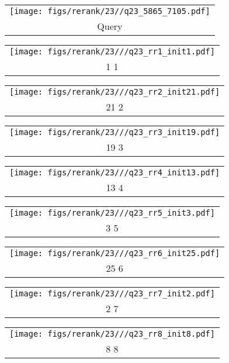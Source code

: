 \begin{figure*}[t]
\begin{tabular}{@{\sssp}c@{\sssp}}\texttt{[image: figs/rerank/23//q23\_5865\_7105.pdf]}\\Query\\ \end{tabular} 
\begin{tabular}{@{\sssp}c@{\sssp}}\texttt{[image: figs/rerank/23///q23\_rr1\_init1.pdf]}\\1  1\\ \end{tabular} 
\begin{tabular}{@{\sssp}c@{\sssp}}\texttt{[image: figs/rerank/23///q23\_rr2\_init21.pdf]}\\21  2\\ \end{tabular} 
\begin{tabular}{@{\sssp}c@{\sssp}}\texttt{[image: figs/rerank/23///q23\_rr3\_init19.pdf]}\\19  3\\ \end{tabular} 
\begin{tabular}{@{\sssp}c@{\sssp}}\texttt{[image: figs/rerank/23///q23\_rr4\_init13.pdf]}\\13  4\\ \end{tabular} 
\begin{tabular}{@{\sssp}c@{\sssp}}\texttt{[image: figs/rerank/23///q23\_rr5\_init3.pdf]}\\3  5\\ \end{tabular} 
\begin{tabular}{@{\sssp}c@{\sssp}}\texttt{[image: figs/rerank/23///q23\_rr6\_init25.pdf]}\\25  6\\ \end{tabular} 
\begin{tabular}{@{\sssp}c@{\sssp}}\texttt{[image: figs/rerank/23///q23\_rr7\_init2.pdf]}\\2  7\\ \end{tabular} 
\begin{tabular}{@{\sssp}c@{\sssp}}\texttt{[image: figs/rerank/23///q23\_rr8\_init8.pdf]}\\8  8\\ \end{tabular} 
  

\end{figure*}
